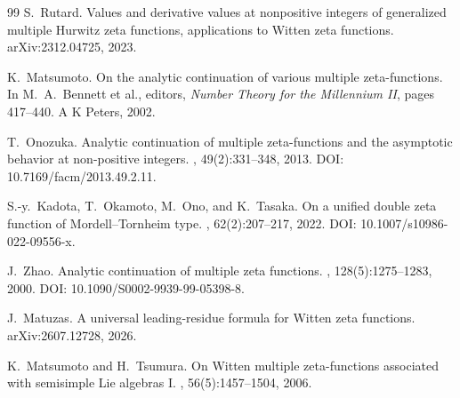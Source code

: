 \documentclass[11pt]{article}
\begin{document}
\begin{thebibliography}{99}
S.~Rutard.
\newblock Values and derivative values at nonpositive integers of generalized
 multiple Hurwitz zeta functions, applications to Witten zeta functions.
\newblock arXiv:2312.04725, 2023.


K.~Matsumoto.
\newblock On the analytic continuation of various multiple zeta-functions.
\newblock In M.~A.~Bennett et al., editors, {\em Number Theory for the
 Millennium II}, pages 417--440. A K Peters, 2002.

T.~Onozuka.
\newblock Analytic continuation of multiple zeta-functions and the
 asymptotic behavior at non-positive integers.
,
 49(2):331--348, 2013.
\newblock DOI: 10.7169/facm/2013.49.2.11.

S.-y.~Kadota, T.~Okamoto, M.~Ono, and K.~Tasaka.
\newblock On a unified double zeta function of Mordell--Tornheim type.
, 62(2):207--217, 2022.
\newblock DOI: 10.1007/s10986-022-09556-x.

J.~Zhao.
\newblock Analytic continuation of multiple zeta functions.
,
 128(5):1275--1283, 2000.
\newblock DOI: 10.1090/S0002-9939-99-05398-8.

J.~Matuzas.
\newblock A universal leading-residue formula for {Witten} zeta functions.
\newblock arXiv:2607.12728, 2026.

K.~Matsumoto and H.~Tsumura.
\newblock On Witten multiple zeta-functions associated with semisimple Lie
  algebras {I}.
, 56(5):1457--1504, 2006.

\end{thebibliography}
\endgroup
\end{document}
